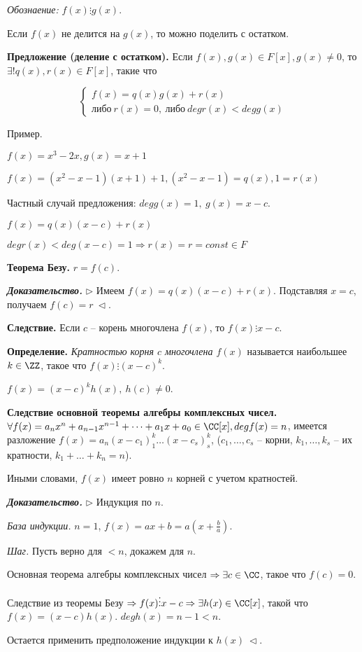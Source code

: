 \textit{Обознаение:} $f(x) \vdots g(x)$.

Если $f(x)$ не делится на $g(x)$, то можно поделить с остатком.

\bigskip
\textbf{Предложение (деление с остатком).} Если $f(x), g(x) \in F[x], g(x) \neq 0$, то $\exists ! q(x), r(x) \in F[x]$, такие что

\begin{equation*}
	\left\{
		\begin{aligned}
			f(x) = q(x) g(x) + r(x)  \\
			либо \ r(x) = 0, \ либо \ degr(x) < degg(x) 
		\end{aligned}
	\right.
\end{equation*}

\bigskip
Пример.

$f(x) = x^3 - 2x, g(x) = x + 1$

$f(x) = (x^2 - x - 1)(x + 1) + 1, (x^2 - x - 1) = q(x), 1 = r(x)$

\bigskip
Частный случай предложения: $deg g(x) = 1, \ g(x) = x - c$.

$f(x) = q(x) (x - c) + r(x)$

$deg r(x) < deg (x - c) = 1 \Rightarrow r(x) = r = const \in F$

\bigskip
\textbf{Теорема Безу.} $r = f(c)$.

\bigskip
\textbf{\textit{Доказательство.}} $\rhd$ Имеем $f(x) = q(x)(x - c) + r(x)$. Подставляя $x=c$, получаем $f(c) = r \ \lhd$.

\bigskip
\textbf{Следствие.} Если $c$ -- корень многочлена $f(x)$, то $f(x) \vdots x - c$.

\bigskip
\textbf{Определение.} \textit{Кратностью корня $c$ многочлена $f(x)$} называется наибольшее $k \in \ZZ$, такое что $f(x) \vdots (x - c)^k$.

$f(x) = (x - c)^k h(x), \ h(c) \neq 0$.

\bigskip
\textbf{Следствие основной теоремы алгебры комплексных чисел.} $\forall f(x) = a_n x^n + a_{n-1} x^{n-1} + \dots + a_1 x + a_0 \in \CC[x], deg f(x) = n$, имеется разложение $f(x) = a_n (x - c_1)^k_1
\dots (x - c_s)^k_s$, ($c_1, \dots, c_s$ -- корни, $k_1, \dots, k_s$ -- их кратности, $k_1 + \dots + k_n = n$).

\bigskip
Иными словами, $f(x)$ имеет ровно $n$ корней с учетом кратностей.

\bigskip
\textbf{\textit{Доказательство.}} $\rhd$ Индукция по $n$.

\textit{База индукции.} $n = 1$, $f(x) = ax + b = a (x + \frac{b}{a})$.

\textit{Шаг.} Пусть верно для $<n$, докажем для $n$.

Основная теорема алгебры комплексных чисел $\Rightarrow \exists c \in \CC$, такое что $f(c) = 0$.

Следствие из теоремы Безу $\Rightarrow f(x) \vdots x - c \Rightarrow \exists h(x) \in \CC[x]$, такой что $f(x) = (x-c)h(x)$. $degh(x) = n-1 < n$.

Остается применить предположение индукции к $h(x) \ \lhd$.

